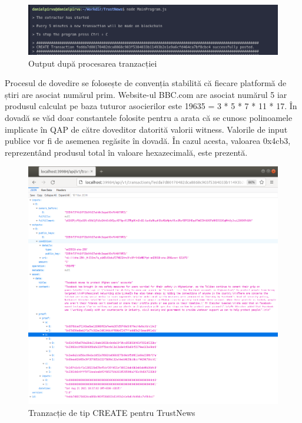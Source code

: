 \begin{figure}[H] 
\centering
\includegraphics[scale=0.6]{Images/SCR3.png}
\caption{Output după procesarea tranzacției}
\end{figure} 

\clearpage

Procesul de dovedire se folosește de convenția stabilită că fiecare platformă de știri are asociat numărul prim. Website-ul BBC.com are asociat numărul 5 iar produsul calculat pe baza tuturor asocierilor este 19635 = 3 * 5 * 7 * 11 * 17. În dovadă se văd doar constantele folosite pentru a arata că se cunosc polinoamele implicate în QAP de către doveditor datorită valorii witness. Valorile de input publice vor fi de asemenea regăsite în dovadă. În cazul acesta, valoarea 0x4cb3, reprezentând produsul total în valoare hexazecimală, este prezentă.\\

\begin{figure}[H] 
\centering
\includegraphics[scale=0.65]{Images/TN_Full_Create.png}
\caption{Tranzacție de tip CREATE pentru TrustNews}
\end{figure}

